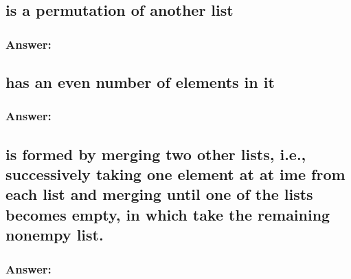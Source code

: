 \documentclass[titlepage]{article}\usepackage[]{graphicx}\usepackage[]{color}
\begin{document}
  \subsection{is a permutation of another list}
  \subsubsection{Answer:}

  \subsection{has an even number of elements in it}
  \subsubsection{Answer:}

  \subsection{is formed by merging two other lists, i.e., successively
  taking one element at at ime from each list and merging until one of the
lists becomes empty, in which take the remaining nonempy list.}
  \subsubsection{Answer:}


  
\end{document}
